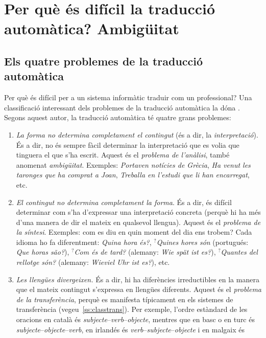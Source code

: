 \chapter[Per què és difícil la TA? Ambigüitat.]{Per què és difícil la traducció automàtica? Ambigüitat}
\label{se:ambig}


\section{Els quatre problemes de la traducció automàtica}

Per què és difícil per a un sistema informàtic traduir com un
professional?  Una classificació interessant dels problemes de la
traducció automàtica la dóna \cite{arnold03p}. Segons aquest autor, la traducció automàtica té quatre grans problemes:
\begin{enumerate}
\item \emph{La forma no determina completament el contingut} (és a
  dir, la \emph{interpretació}). És a dir, no és sempre fàcil
  determinar la interpretació que es volia que tinguera el que s'ha
  escrit. Aquest és el \emph{problema de l'anàlisi}, també anomenat
  \emph{ambigüitat}. Exemples:
  \emph{Portaven notícies de Grècia}, \emph{Ha venut les taronges que
    ha comprat a Joan}, \emph{Treballa en l'estudi que li han
    encarregat}, etc.
\item \emph{El contingut no determina completament la forma}. És a
  dir, és difícil determinar com s'ha d'expressar una interpretació
  concreta (perquè hi ha més d'una manera de dir el mateix en
  qualsevol llengua). Aquest és el \emph{problema de la
    síntesi}. Exemples: com es diu en quin moment del dia ens trobem?
  Cada idioma ho fa diferentment: \emph{Quina hora és?},
  $^?$\emph{Quines hores són} (portugués: \emph{Que horas são?}),
  $^?$\emph{Com és de tard?}  (alemany: \emph{Wie spät ist es?}),
  $^?$\emph{Quantes del rellotge són?} (alemany: \emph{Wieviel Uhr ist
    es?}), etc.
\item \emph{Les llengües divergeixen.} És a dir, hi ha diferències
  irreductibles en la manera que el mateix contingut s'expressa en
  llengües diferents. Aquest és el \emph{problema de la
    transferència}, perquè es manifesta típicament en els sistemes de
  transferència (vegeu~\ref{ss:classtrans}). Per exemple, l'ordre
  estàndard de les oracions en català és
  \emph{subjecte}--\emph{verb}--\emph{objecte}, mentres que en basc o
  en turc és \emph{subjecte}--\emph{objecte}--\emph{verb}, en irlandés
  és \emph{verb}--\emph{subjecte}--\emph{objecte} i en malgaix és

\end{enumerate}
